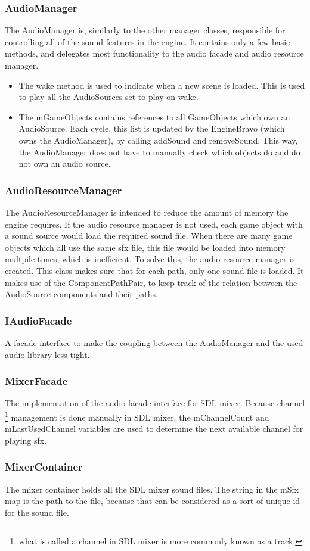 \subsubsection{AudioManager}
The AudioManager is, similarly to the other manager classes, responsible for controlling all of the sound features in the engine.
It contains only a few basic methods, and delegates most functionality to the audio facade and audio resource manager.

\begin{itemize}
    \item The wake method is used to indicate when a new scene is loaded. This is used to play all the AudioSources set to play on wake.
    \item The mGameObjects contains references to all GameObjects which own an AudioSource. Each cycle, this list is updated by the EngineBravo (which owns the AudioManager), by calling addSound and removeSound. This way, the AudioManager does not have to manually check which objects do and do not own an audio source.
\end{itemize}

\subsubsection{AudioResourceManager}
The AudioResourceManager is intended to reduce the amount of memory the engine requires.
If the audio resource manager is not used, each game object with a sound source would load the required sound file.
When there are many game objects which all use the same sfx file, this file would be loaded into memory multpile times, which is inefficient.
To solve this, the audio resource manager is created. This class makes sure that for each path, only one sound file is loaded.
It makes use of the ComponentPathPair, to keep track of the relation between the AudioSource components and their paths.

\subsubsection{IAudioFacade}
A facade interface to make the coupling between the AudioManager and the used audio library less tight.

\subsubsection{MixerFacade}
The implementation of the audio facade interface for SDL mixer.
Because channel \footnote{what is called a channel in SDL mixer is more commonly known as a track.} management is done
manually in SDL mixer, the mChannelCount and mLastUsedChannel variables are used to determine the next available channel for playing sfx.

\subsubsection{MixerContainer}
The mixer container holds all the
SDL mixer sound files.
The string in the mSfx map is the path to the file, because that can be considered as a sort of unique id for the sound file.